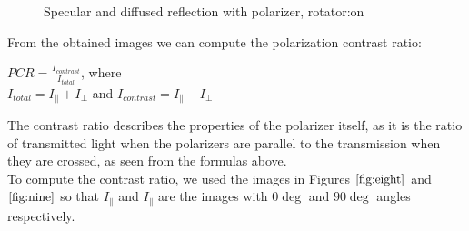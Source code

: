 \documentclass[english]{article}
\begin{document}
\begin{figure}[H]
	\centering
	\caption{Specular and diffused reflection with polarizer, rotator:on}
	\label{fig:nine}
\end{figure}
From the obtained images we can compute the polarization contrast ratio:\\
\begin{center}
$PCR = \frac{I_{contrast}}{I_{total}}$,
where\\

$I_{total} = I_{\parallel} + I_{\perp}$ 
and 
$I_{contrast} = I_{\parallel} - I_{\perp}$
\end{center}
The contrast ratio describes the properties of the polarizer itself, as it is the ratio of transmitted light when the polarizers are parallel to the transmission when they are crossed, as seen from the formulas above.\\
To compute the contrast ratio, we used the images in Figures $\ref{fig:eight}$ and $\ref{fig:nine}$ so that $I_{\parallel}$ and $I_{\parallel}$ are the images with $0\deg$ and $90\deg$ angles respectively.\\
\end{document}

